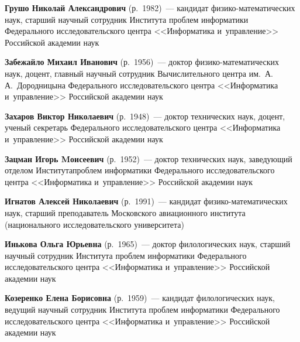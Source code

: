 \begin{multicols}{2}
\noindent
\textbf{Грушо Николай Александрович} (р.\ 1982)~--- кандидат 
фи\-зи\-ко-ма\-те\-ма\-ти\-че\-ских наук, старший научный со\-труд\-ник 
Института проб\-лем информатики Федерального исследовательского цент\-ра 
<<Информатика и~управ\-ле\-ние>> Российской академии наук

\vspace*{3pt}

\noindent
\textbf{Забежайло Михаил Иванович} (р.\ 1956)~--- доктор 
фи\-зи\-ко-ма\-те\-ма\-ти\-че\-ских наук, доцент, главный научный со\-труд\-ник 
Вычислительного центра им.\ А.\,А.~Дородницына Федерального исследовательского цент\-ра 
<<Информатика и~управ\-ле\-ние>> Российской академии наук

\vspace*{3pt}


\noindent
\textbf{Захаров Виктор Николаевич} (р.\ 1948)~--- 
доктор технических наук, доцент, ученый секретарь Федерального
 исследовательского центра <<Информатика и~управ\-ле\-ние>> 
 Российской академии наук
 
 \vspace*{3pt}
 
 \noindent
\textbf{Зацман Игорь Mоисеевич} (р.\ 1952)~--- доктор тех\-нических наук, 
за\-ве\-ду\-ющий отделом Института\linebreak проб\-лем информатики Федерального 
исследовательского цент\-ра <<Информатика и~управ\-ле\-ние>> 
Российской академии наук 

\vspace*{3pt}

\noindent
\textbf{Игнатов Алексей Николаевич} (р.\ 1991)~--- 
кандидат фи\-зи\-ко-ма\-те\-ма\-ти\-че\-ских наук, старший преподаватель 
Московского авиационного института (национального исследовательского университета)

\vspace*{3pt}

\noindent
\textbf{Инькова Ольга Юрьевна} (р.\ 1965)~--- доктор филологических наук, старший научный сотрудник 
Института проблем информатики Федерального 
исследовательского цент\-ра <<Информатика и~управ\-ле\-ние>>
 Российской академии наук

\vspace*{3pt}


\noindent
\textbf{Козеренко Елена Борисовна} (р.\ 1959)~--- 
кандидат филологических наук, ведущий научный сотрудник Института 
проблем информатики Федерального исследовательского центра <<Информатика 
и~управ\-ле\-ние>> 
Российской академии наук




\end{multicols}
